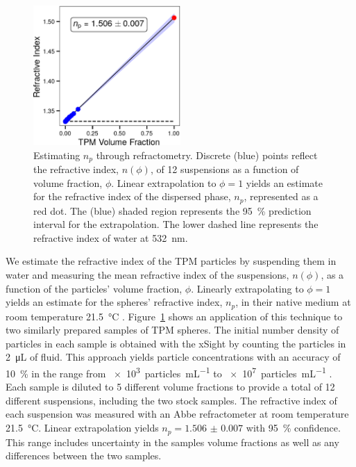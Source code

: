 \documentclass[journal=langd5,manuscript=article]{achemso}
\begin{document}
\begin{figure}
  \centering
  \includegraphics[width=0.5\textwidth]{abbe02}
  \caption{Estimating $n_p$ through refractometry.
    Discrete (blue) points reflect the refractive index,
    $n(\phi)$, of \num{12} suspensions as a function of volume fraction,
    $\phi$. Linear extrapolation to $\phi = 1$
    yields an estimate for the refractive index of the dispersed phase,
    $n_p$, represented as a red dot.
    The (blue) shaded region represents the \SI{95}{\percent}
    prediction interval for the extrapolation.
    The lower dashed line represents the refractive index of water at
    \SI{532}{\nm}.}
  \label{fig:abbe}
\end{figure}

We estimate the refractive index of the TPM particles
by suspending them in water and measuring the mean refractive index of
the suspensions,
$n(\phi)$,
as a function of the particles' volume fraction, $\phi$.
Linearly extrapolating  to $\phi = 1$
yields an estimate for the spheres' refractive index,
$n_p$,
in their native medium at room temperature \SI{21.5}{\celsius}
\cite{alexander81}.
Figure~\ref{fig:abbe} shows an application
of this technique to two similarly prepared
samples of TPM spheres.
The initial number density of particles in each
sample is obtained with the xSight by counting
the particles in \SI{2}{\micro\liter} of fluid.
This approach yields particle concentrations with
an accuracy of \SI{10}{\percent} in the range
from \SI{e3}{particles\per\milli\liter}
to \SI{e7}{particles\per\milli\liter} \cite{wang2016holographic}.
Each sample is diluted to \num{5} different volume 
fractions to provide a total of \num{12}
different suspensions, including the two stock samples.
The refractive index of each
suspension was measured with an Abbe refractometer
at room temperature \SI{21.5}{\degreeCelsius}.
Linear extrapolation yields
$n_p = \num{1.506(7)}$ with \SI{95}{\percent} confidence.
This range includes uncertainty in the samples
volume fractions as well as any differences between the
two samples.
\end{document}
